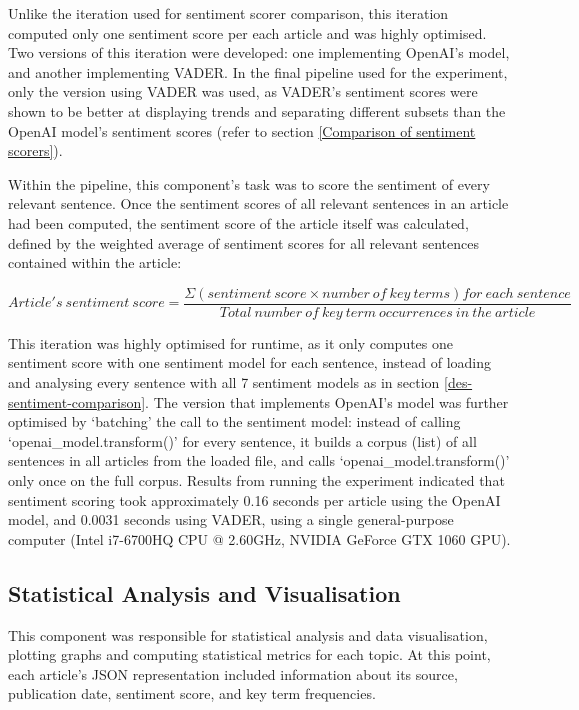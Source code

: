 \documentclass{report}
\begin{document}
Unlike the iteration used for sentiment scorer comparison, this iteration computed only one sentiment score per each article and was highly optimised.
Two versions of this iteration were developed: one implementing OpenAI's model, and another implementing VADER.
In the final pipeline used for the experiment, only the version using VADER was used, as VADER's sentiment scores were shown to be better at displaying trends and separating different subsets than the OpenAI model's sentiment scores (refer to section \ref{Comparison of sentiment scorers}).

Within the pipeline, this component's task was to score the sentiment of every relevant sentence.
Once the sentiment scores of all relevant sentences in an article had been computed, the sentiment score of the article itself was calculated, defined by the weighted average of sentiment scores for all relevant sentences contained within the article:

\begin{center}
	$Article's \ sentiment \ score = \dfrac{\Sigma (sentiment \ score \times number \ of \ key \ terms) for \ each \ sentence}{Total \ number \ of \ key \ term \ occurrences \ in \ the \ article}$
\end{center}

This iteration was highly optimised for runtime, as it only computes one sentiment score with one sentiment model for each sentence, instead of loading and analysing every sentence with all 7 sentiment models as in section \ref{des-sentiment-comparison}.
The version that implements OpenAI's model was further optimised by `batching' the call to the sentiment model: 
instead of calling `openai\_model.transform()' for every sentence, it builds a corpus (list) of all sentences in all articles from the loaded file, and calls `openai\_model.transform()' only once on the full corpus.
Results from running the experiment indicated that sentiment scoring took approximately 0.16 seconds per article using the OpenAI model, and 0.0031 seconds using VADER, using a single general-purpose computer (Intel i7-6700HQ CPU @ 2.60GHz, NVIDIA GeForce GTX 1060 GPU).

\subsection{Statistical Analysis and Visualisation} \label{des-visualisation}

This component was responsible for statistical analysis and data visualisation, plotting graphs and computing statistical metrics for each topic.
At this point, each article's JSON representation included information about its source, publication date, sentiment score, and key term frequencies.
\end{document}
